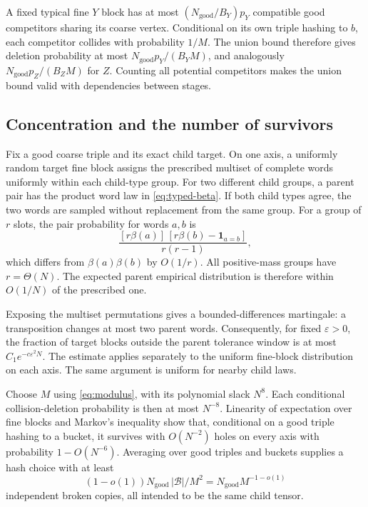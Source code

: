 \documentclass[11pt,a4paper]{article}
\newcommand{\Ngood}{N_{\mathrm{good}}}
\begin{document}
A fixed typical fine $Y$ block has at most $(\Ngood/B_Y)p_Y$ compatible good competitors sharing its coarse vertex. Conditional on its own triple hashing to $b$, each competitor collides with probability $1/M$. The union bound therefore gives deletion probability at most $\Ngood p_Y/(B_YM)$, and analogously $\Ngood p_Z/(B_ZM)$ for $Z$. Counting all potential competitors makes the union bound valid with dependencies between stages.

\subsection{Concentration and the number of survivors}

Fix a good coarse triple and its exact child target. On one axis, a uniformly random target fine block assigns the prescribed multiset of complete words uniformly within each child-type group. For two different child groups, a parent pair has the product word law in \cref{eq:typed-beta}. If both child types agree, the two words are sampled without replacement from the same group. For a group of $r$ slots, the pair probability for words $a,b$ is
\[
\frac{[r\beta(a)]\,[r\beta(b)-\mathbf1_{a=b}]}{r(r-1)},
\]
which differs from $\beta(a)\beta(b)$ by $O(1/r)$. All positive-mass groups have $r=\Theta(N)$. The expected parent empirical distribution is therefore within $O(1/N)$ of the prescribed one.

Exposing the multiset permutations gives a bounded-differences martingale: a transposition changes at most two parent words. Consequently, for fixed $\varepsilon>0$, the fraction of target blocks outside the parent tolerance window is at most $C_1e^{-c\varepsilon^2N}$. The estimate applies separately to the uniform fine-block distribution on each axis. The same argument is uniform for nearby child laws.

Choose $M$ using \cref{eq:modulus}, with its polynomial slack $N^8$. Each conditional collision-deletion probability is then at most $N^{-8}$. Linearity of expectation over fine blocks and Markov's inequality show that, conditional on a good triple hashing to a bucket, it survives with $O(N^{-2})$ holes on every axis with probability $1-O(N^{-6})$. Averaging over good triples and buckets supplies a hash choice with at least
\begin{equation}\label{eq:broken-copies}
(1-o(1))\Ngood\,|\mathcal B|/M^2=\Ngood M^{-1-o(1)}
\end{equation}
independent broken copies, all intended to be the same child tensor.
\end{document}
